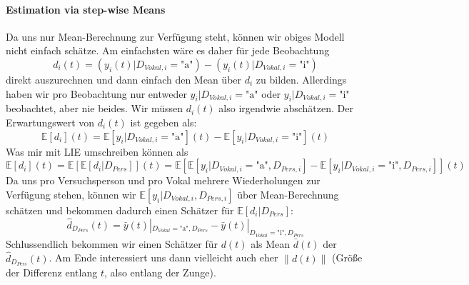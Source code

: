 \paragraph{Estimation via step-wise Means}
Da uns nur Mean-Berechnung zur Verfügung steht, können wir obiges Modell nicht einfach schätze. Am einfachsten wäre es daher für jede Beobachtung
$$ d_i(t) = (y_i(t) | D_{Vokal, i} = \text{"a"})  - (y_i(t) | D_{Vokal, i} = \text{"i"}) $$
direkt auszurechnen und dann einfach den Mean über $d_i$ zu bilden.
Allerdings haben wir pro Beobachtung nur entweder $y_i | D_{Vokal, i} = \text{"a"}$ oder $y_i | D_{Vokal, i} = \text{"i"}$ beobachtet, aber nie beides.
Wir müssen $d_i(t)$ also irgendwie abschätzen. Der Erwartungswert von $d_i(t)$ ist gegeben als:
$$ \mathbb{E}\left[d_i\right](t) = \mathbb{E}\left[y_i | D_{Vokal, i} = \text{"a"}\right](t)  - \mathbb{E}\left[y_i | D_{Vokal, i} = \text{"i"}\right](t) $$
Was mir mit LIE umschreiben können als
$$ \mathbb{E}\left[d_i\right](t) = \mathbb{E}\left[ \mathbb{E}\left[d_i | D_{Pers} \right]\right](t) = \mathbb{E}\left[ \mathbb{E}\left[y_i | D_{Vokal, i} = \text{"a"}, D_{Pers, i} \right]  - \mathbb{E}\left[y_i | D_{Vokal, i} = \text{"i"}, D_{Pers, i}\right] \right](t) $$
Da uns pro Versuchsperson und pro Vokal mehrere Wiederholungen zur Verfügung stehen, können wir $\mathbb{E}\left[y_i | D_{Vokal, i}, D_{Pers, i} \right] $ über Mean-Berechnung schätzen und bekommen dadurch einen Schätzer für $\mathbb{E}\left[d_i | D_{Pers} \right]$:
$$ \hat{d}_{D_{Pers}} (t) = \bar{y}(t)|_{D_{Vokal} = \text{"a"}, D_{Pers}} - \bar{y}(t)|_{D_{Vokal} = \text{"i"}, D_{Pers}}$$
Schlussendlich bekommen wir einen Schätzer für $d(t)$ als Mean $\bar{d}(t)$ der $\hat{d}_{D_{Pers}}(t)$.
Am Ende interessiert uns dann vielleicht auch eher $\lVert d(t) \rVert$ (Größe der Differenz entlang $t$, also entlang der Zunge).
